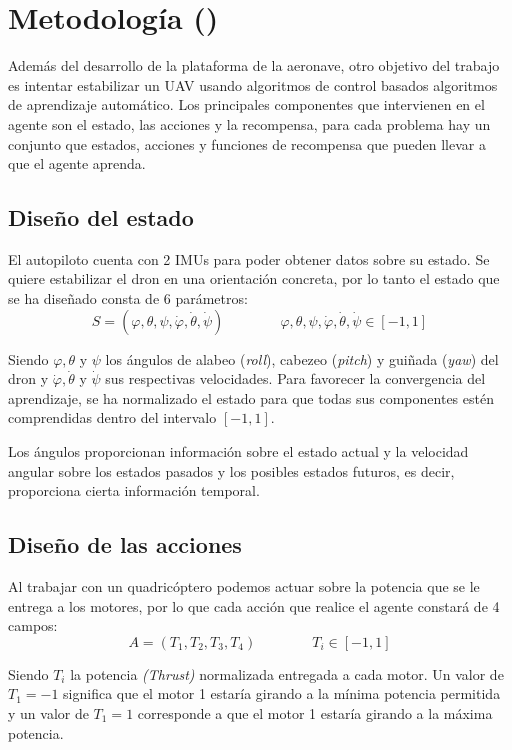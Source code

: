 \chapter{Metodología ()}

Además del desarrollo de la plataforma de la aeronave, otro objetivo del trabajo es intentar estabilizar un UAV usando algoritmos de control basados algoritmos de aprendizaje automático. Los principales componentes que intervienen en el agente son el estado, las acciones y la recompensa, para cada problema hay un conjunto que estados, acciones y funciones de recompensa que pueden llevar a que el agente aprenda.

\section{Diseño del estado}
 El autopiloto cuenta con 2 IMUs para poder obtener datos sobre su estado. Se quiere estabilizar el dron en una orientación concreta, por lo tanto el estado que se ha diseñado consta de 6 parámetros:
\begin{equation}
	S=(\varphi,\theta,\psi,\dot\varphi,\dot\theta,\dot\psi) \qquad\qquad \varphi,\theta,\psi,\dot\varphi,\dot\theta,\dot\psi \in [-1,1]
\end{equation} 

Siendo $\varphi,\theta$ y $\psi$ los ángulos de alabeo (\textit{roll}), cabezeo (\textit{pitch}) y guiñada (\textit{yaw}) del dron  y $\dot\varphi,\dot\theta$ y $\dot\psi$ sus respectivas velocidades. Para favorecer la convergencia del aprendizaje, se ha normalizado el estado para que todas sus componentes estén comprendidas dentro del intervalo $[-1,1]$.

Los ángulos proporcionan información sobre el estado actual y la velocidad angular sobre los estados pasados y los posibles estados futuros, es decir, proporciona cierta información temporal. 

\section{Diseño de las acciones}
Al trabajar con un quadricóptero podemos actuar sobre la potencia que se le entrega a los motores, por lo que cada acción que realice el agente constará de 4 campos:
\begin{equation}
	A = (T_1,T_2,T_3,T_4) \qquad\qquad T_i \in [-1,1]
\end{equation}

Siendo $T_i$ la potencia \textit{(Thrust)} normalizada entregada a cada motor. Un valor de $T_1=-1$ significa que el motor 1 estaría girando a la mínima potencia permitida y un valor de $T_1=1$ corresponde a que el motor 1 estaría girando a la máxima potencia.\\

